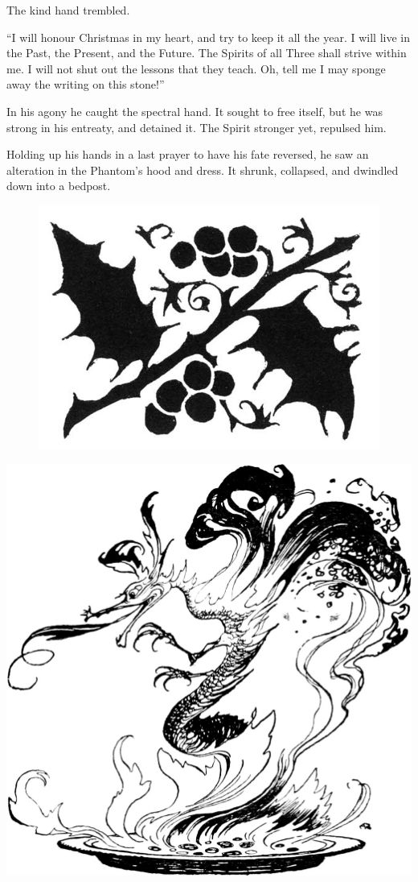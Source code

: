 \documentclass[paper=5.5in:8.5in,BCOR=7mm,twoside,DIV=calc,12pt,usegeometry]{scrbook} %
\begin{document}
The kind hand trembled.

\enquote{I will honour Christmas in my heart, and try to keep it all the year. I will live in the Past, the Present, and the Future. The Spirits of all Three shall strive within me. I will not shut out the lessons that they teach. Oh, tell me I may sponge away the writing on this stone!}

In his agony he caught the spectral hand. It sought to free itself, but he was strong in his entreaty, and detained it. The Spirit stronger yet, repulsed him.

Holding up his hands in a last prayer to have his fate reversed, he saw an alteration in the Phantom's hood and dress. It shrunk, collapsed, and dwindled down into a bedpost.

\begin{figure}[tbh]
\centering
\includegraphics[width=.5\linewidth]{gs056}
\end{figure}

\begin{minipage}[c]{\linewidth}
\includegraphics[width=\linewidth]{snapdragonimproved}
\end{minipage}
\end{document}
